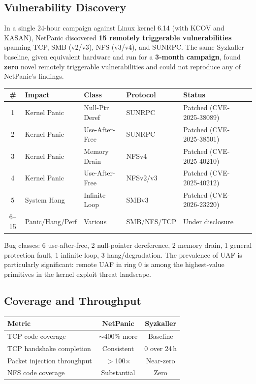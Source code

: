 \documentclass[10pt]{article}
\begin{document}
\subsection{Vulnerability Discovery}

In a single 24-hour campaign against Linux kernel 6.14 (with KCOV and KASAN), NetPanic discovered \textbf{15 remotely triggerable vulnerabilities} spanning TCP, SMB (v2/v3), NFS (v3/v4), and SUNRPC. The same Syzkaller baseline, given equivalent hardware and run for a \textbf{3-month campaign}, found \textbf{zero} novel remotely triggerable vulnerabilities and could not reproduce any of NetPanic's findings.

\begin{center}
\small
\setlength{\tabcolsep}{4pt}
\begin{tabular}{clllll}
\toprule
\textbf{\#} & \textbf{Impact} & \textbf{Class} & \textbf{Protocol} & \textbf{Status} \\
\midrule
1  & Kernel Panic     & Null-Ptr Deref   & SUNRPC  & Patched (CVE-2025-38089) \\
2  & Kernel Panic     & Use-After-Free   & SUNRPC  & Patched (CVE-2025-38501) \\
3  & Kernel Panic     & Memory Drain     & NFSv4   & Patched (CVE-2025-40210) \\
4  & Kernel Panic     & Use-After-Free   & NFSv2/v3& Patched (CVE-2025-40212) \\
5  & System Hang      & Infinite Loop    & SMBv3   & Patched (CVE-2026-23220) \\
6--15 & Panic/Hang/Perf & Various        & SMB/NFS/TCP & Under disclosure \\
\bottomrule
\end{tabular}
\end{center}

Bug classes: 6 use-after-free, 2 null-pointer dereference, 2 memory drain, 1 general protection fault, 1 infinite loop, 3 hang/degradation. The prevalence of UAF is particularly significant: remote UAF in ring 0 is among the highest-value primitives in the kernel exploit threat landscape.

\subsection{Coverage and Throughput}

\begin{center}
\small
\begin{tabular}{lcc}
\toprule
\textbf{Metric} & \textbf{NetPanic} & \textbf{Syzkaller} \\
\midrule
TCP code coverage  & $\sim$400\% more & Baseline \\
TCP handshake completion & Consistent & 0 over 24\,h \\
Packet injection throughput & $>$100$\times$ & Near-zero \\
NFS code coverage & Substantial & Zero \\
\bottomrule
\end{tabular}
\end{center}
\end{document}
